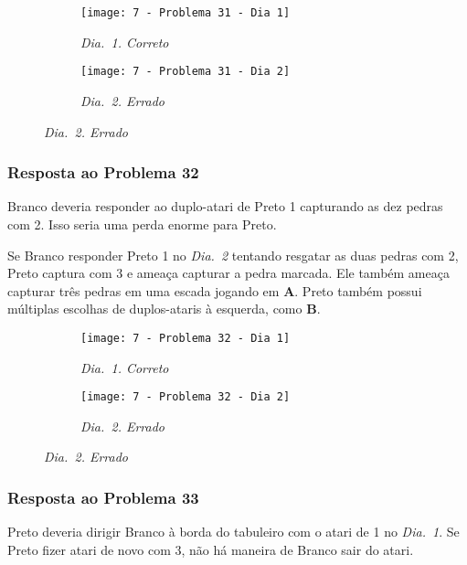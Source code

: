 \begin{figure}[h!]
    \centering
    \begin{subfigure}[t]{.31\textwidth}
        \texttt{[image: 7 - Problema 31 - Dia 1]}
        \caption*{\emph{Dia.\@~1. Correto}}
    \end{subfigure}
    \hspace{1cm}
    \begin{subfigure}[t]{.31\textwidth}
        \texttt{[image: 7 - Problema 31 - Dia 2]}
        \caption*{\emph{Dia.\@~2. Errado}}
    \end{subfigure}
\end{figure}

\subsubsection*{Resposta ao Problema 32}

Branco deveria responder ao duplo-atari de Preto 1 capturando as dez pedras com 2. Isso seria uma perda enorme para Preto.

Se Branco responder Preto 1 no \emph{Dia.\@~2} tentando resgatar as duas pedras com 2, Preto captura com 3 e ameaça capturar a pedra marcada. Ele também ameaça capturar três pedras em uma escada jogando em \textbf{A}. Preto também possui múltiplas escolhas de duplos-ataris à esquerda, como \textbf{B}.

\begin{figure}[h!]
    \centering
    \begin{subfigure}[t]{.31\textwidth}
        \texttt{[image: 7 - Problema 32 - Dia 1]}
        \caption*{\emph{Dia.\@~1. Correto}}
    \end{subfigure}
    \hspace{1cm}
    \begin{subfigure}[t]{.31\textwidth}
        \texttt{[image: 7 - Problema 32 - Dia 2]}
        \caption*{\emph{Dia.\@~2. Errado}}
    \end{subfigure}
\end{figure}

\pagebreak

\subsubsection*{Resposta ao Problema 33}

Preto deveria dirigir Branco à borda do tabuleiro com o atari de 1 no \emph{Dia.\@~1}. Se Preto fizer atari de novo com 3, não há maneira de Branco sair do atari.

